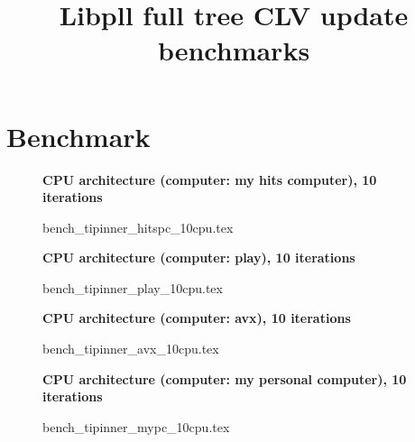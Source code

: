 \documentclass[a4paper]{article}
\begin{document}
\newcommand*{\figuretitle}[1]{%
    {\centering%
    \textbf{#1}%
    \par\medskip}%
}


\title{Libpll full tree CLV update benchmarks}
\maketitle



\section{Benchmark}


\begin{figure}[!htb]
\figuretitle{CPU architecture (computer: my hits computer), 10 iterations}
{bench_tipinner_hitspc_10cpu.tex}
\end{figure}

\begin{figure}[!htb]
\figuretitle{CPU architecture (computer: play), 10 iterations}
{bench_tipinner_play_10cpu.tex}
\end{figure}

\begin{figure}[!htb]
\figuretitle{CPU architecture (computer: avx), 10 iterations}
{bench_tipinner_avx_10cpu.tex}
\end{figure}


\begin{figure}[!htb]
\figuretitle{CPU architecture (computer: my personal computer), 10 iterations}
{bench_tipinner_mypc_10cpu.tex}
\end{figure}
\end{document}
